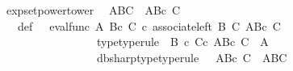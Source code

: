 \begin{isabellebody}
%
\endisatagproof
{\isafoldproof}%
%
\isadelimproof
\isanewline
%
\endisadelimproof
\isanewline
{}\isamarkupfalse%
\ expset{\isacharunderscore}{\kern0pt}power{\isacharunderscore}{\kern0pt}tower{\isacharcolon}{\kern0pt}\isanewline
\ \ {\isachardoublequoteopen}{\isacharparenleft}{\kern0pt}A\isactrlbsup B\isactrlesup {\isacharparenright}{\kern0pt}\isactrlbsup C\isactrlesup \ {\isasymcong}\ A\isactrlbsup {\isacharparenleft}{\kern0pt}B{\isasymtimes}\isactrlsub c\ C{\isacharparenright}{\kern0pt}\isactrlesup {\isachardoublequoteclose}\isanewline
%
\isadelimproof
%
\endisadelimproof
%
\isatagproof
{}\isamarkupfalse%
\ {\isacharminus}{\kern0pt}\ \isanewline
\ \ \isamarkupfalse%
\ {\isasymphi}\ \ {\isasymphi}{\isacharunderscore}{\kern0pt}def{\isacharcolon}{\kern0pt}\ {\isachardoublequoteopen}{\isasymphi}\ {\isacharequal}{\kern0pt}\ {\isacharparenleft}{\kern0pt}{\isacharparenleft}{\kern0pt}eval{\isacharunderscore}{\kern0pt}func\ A\ {\isacharparenleft}{\kern0pt}B{\isasymtimes}\isactrlsub c\ C{\isacharparenright}{\kern0pt}{\isacharparenright}{\kern0pt}\ {\isasymcirc}\isactrlsub c\ {\isacharparenleft}{\kern0pt}associate{\isacharunderscore}{\kern0pt}left\ B\ C\ {\isacharparenleft}{\kern0pt}A\isactrlbsup {\isacharparenleft}{\kern0pt}B{\isasymtimes}\isactrlsub c\ C{\isacharparenright}{\kern0pt}\isactrlesup {\isacharparenright}{\kern0pt}{\isacharparenright}{\kern0pt}{\isacharparenright}{\kern0pt}{\isachardoublequoteclose}\ \isanewline
\ \ \ \ \ \ \ \ \ \ \ \ \ \ \ \ \ {\isasymphi}{\isacharunderscore}{\kern0pt}type{\isacharbrackleft}{\kern0pt}type{\isacharunderscore}{\kern0pt}rule{\isacharbrackright}{\kern0pt}{\isacharcolon}{\kern0pt}\ {\isachardoublequoteopen}{\isasymphi}{\isacharcolon}{\kern0pt}\ B\ {\isasymtimes}\isactrlsub c\ {\isacharparenleft}{\kern0pt}C{\isasymtimes}\isactrlsub c\ {\isacharparenleft}{\kern0pt}A\isactrlbsup {\isacharparenleft}{\kern0pt}B{\isasymtimes}\isactrlsub c\ C{\isacharparenright}{\kern0pt}\isactrlesup {\isacharparenright}{\kern0pt}{\isacharparenright}{\kern0pt}\ {\isasymrightarrow}\ A{\isachardoublequoteclose}\ \ \isanewline
\ \ \ \ \ \ \ \ \ \ \ \ \ \ \ \ \ {\isasymphi}dbsharp{\isacharunderscore}{\kern0pt}type{\isacharbrackleft}{\kern0pt}type{\isacharunderscore}{\kern0pt}rule{\isacharbrackright}{\kern0pt}{\isacharcolon}{\kern0pt}\ {\isachardoublequoteopen}{\isacharparenleft}{\kern0pt}{\isasymphi}\isactrlsup {\isasymsharp}{\isacharparenright}{\kern0pt}\isactrlsup {\isasymsharp}\ {\isacharcolon}{\kern0pt}\ {\isacharparenleft}{\kern0pt}A\isactrlbsup {\isacharparenleft}{\kern0pt}B{\isasymtimes}\isactrlsub c\ C{\isacharparenright}{\kern0pt}\isactrlesup {\isacharparenright}{\kern0pt}\ {\isasymrightarrow}\ {\isacharparenleft}{\kern0pt}{\isacharparenleft}{\kern0pt}A\isactrlbsup B\isactrlesup {\isacharparenright}{\kern0pt}\isactrlbsup C\isactrlesup {\isacharparenright}{\kern0pt}{\isachardoublequoteclose}\isanewline

\end{isabellebody}
